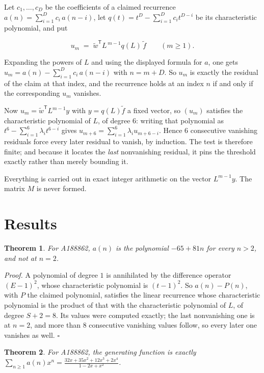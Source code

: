 \documentclass[11pt]{article}
\newtheorem{theorem}{Theorem}
\theoremstyle{definition}
\begin{document}
Let $c_1,\dots,c_D$ be the coefficients of a claimed recurrence $a(n) = \sum_{i=1}^{D} c_i\,a(n-i)$, let $q(t) = t^{D} - \sum_{i=1}^{D} c_i t^{D-i}$ be its characteristic polynomial, and put

\[u_m \;=\; \tilde w^{\mathsf T} L^{\,m-1} q(L)\,\tilde f \qquad (m \ge 1).\]

Expanding the powers of $L$ and using the displayed formula for $a$, one gets $u_m = a(n) - \sum_{i=1}^{D} c_i\,a(n-i)$ with $n = m + D$. So $u_m$ is exactly the residual of the claim at that index, and the recurrence holds at an index $n$ if and only if the corresponding $u_m$ vanishes.

Now $u_m = \tilde w^{\mathsf T} L^{m-1} y$ with $y = q(L)\tilde f$ a fixed vector, so $(u_m)$ satisfies the characteristic polynomial of $L$, of degree $6$: writing that polynomial as $t^{6} - \sum_{i=1}^{6} \lambda_i t^{6-i}$ gives $u_{m+6} = \sum_{i=1}^{6} \lambda_i u_{m+6-i}$. Hence $6$ consecutive vanishing residuals force every later residual to vanish, by induction. The test is therefore finite; and because it locates the {\itshape last} nonvanishing residual, it pins the threshold exactly rather than merely bounding it.

Everything is carried out in exact integer arithmetic on the vector $L^{m-1}y$. The matrix $M$ is never formed.

\section{Results}

\begin{theorem} For A188862, $a(n)$ is the polynomial $-65 + 81n$ for every $n > 2$, and not at $n = 2$.\end{theorem}

{\itshape Proof.} A polynomial of degree $1$ is annihilated by the difference operator $(E-1)^{2}$, whose characteristic polynomial is $(t-1)^{2}$. So $a(n) - P(n)$, with $P$ the claimed polynomial, satisfies the linear recurrence whose characteristic polynomial is the product of that with the characteristic polynomial of $L$, of degree $S + 2 = 8$. Its values were computed exactly; the last nonvanishing one is at $n = 2$, and more than $8$ consecutive vanishing values follow, so every later one vanishes as well. $\square$

\begin{theorem} For A188862, the generating function is exactly $\sum_{n\ge 1} a(n)x^n = \frac{32x + 35x^{2} + 12x^{3} + 2x^{4}}{1 - 2x + x^{2}}$.\end{theorem}
\end{document}
